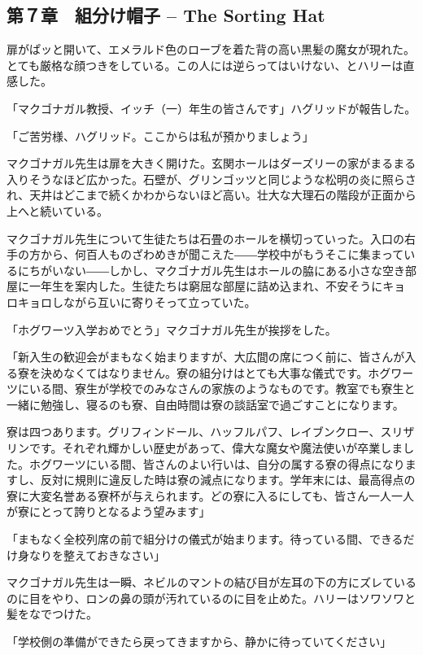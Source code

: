 \documentclass[10pt,a4paper]{article}
\begin{document}
\begin{CJK}{UTF8}{min}
\section{第７章　組分け帽子 -- The Sorting Hat}





扉がぱッと開いて、エメラルド色のローブを着た背の高い黒髪の魔女が現れた。とても厳格な顔つきをしている。この人には逆らってはいけない、とハリーは直感した。

「マクゴナガル教授、イッチ（一）年生の皆さんです」ハグリッドが報告した。

「ご苦労様、ハグリッド。ここからは私が預かりましょう」

マクゴナガル先生は扉を大きく開けた。玄関ホールはダーズリーの家がまるまる入りそうなほど広かった。石壁が、グリンゴッツと同じような松明の炎に照らされ、天井はどこまで続くかわからないほど高い。壮大な大理石の階段が正面から上へと続いている。

マクゴナガル先生について生徒たちは石畳のホールを横切っていった。入口の右手の方から、何百人ものざわめきが聞こえた――学校中がもうそこに集まっているにちがいない――しかし、マクゴナガル先生はホールの脇にある小さな空き部屋に一年生を案内した。生徒たちは窮屈な部屋に詰め込まれ、不安そうにキョロキョロしながら互いに寄りそって立っていた。

「ホグワーツ入学おめでとう」マクゴナガル先生が挨拶をした。

「新入生の歓迎会がまもなく始まりますが、大広間の席につく前に、皆さんが入る寮を決めなくてはなりません。寮の組分けはとても大事な儀式です。ホグワーツにいる間、寮生が学校でのみなさんの家族のようなものです。教室でも寮生と一緒に勉強し、寝るのも寮、自由時間は寮の談話室で過ごすことになります。

寮は四つあります。グリフィンドール、ハッフルパフ、レイブンクロー、スリザリンです。それぞれ輝かしい歴史があって、偉大な魔女や魔法使いが卒業しました。ホグワーツにいる間、皆さんのよい行いは、自分の属する寮の得点になりますし、反対に規則に違反した時は寮の減点になります。学年末には、最高得点の寮に大変名誉ある寮杯が与えられます。どの寮に入るにしても、皆さん一人一人が寮にとって誇りとなるよう望みます」

「まもなく全校列席の前で組分けの儀式が始まります。待っている間、できるだけ身なりを整えておきなさい」

マクゴナガル先生は一瞬、ネビルのマントの結び目が左耳の下の方にズレているのに目をやり、ロンの鼻の頭が汚れているのに目を止めた。ハリーはソワソワと髪をなでつけた。

「学校側の準備ができたら戻ってきますから、静かに待っていてください」


\end{CJK}
\end{document}
